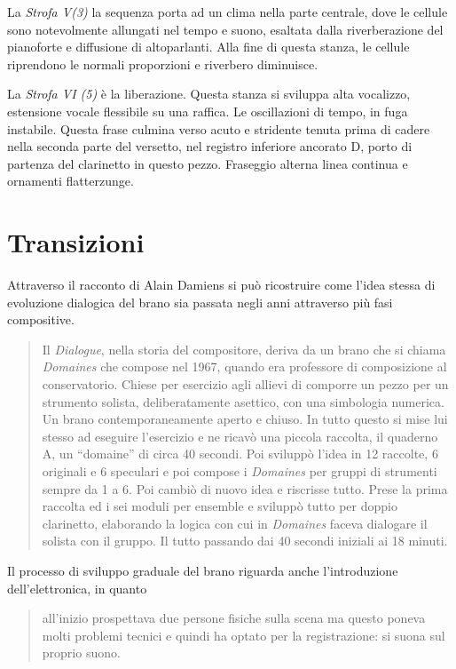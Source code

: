 La \emph{Strofa V(3)} la sequenza porta ad un clima nella parte centrale, dove le cellule sono notevolmente allungati nel tempo e suono, esaltata dalla riverberazione del pianoforte e diffusione di altoparlanti. Alla fine di questa stanza, le cellule riprendono le normali proporzioni e riverbero diminuisce.

La \emph{Strofa VI (5)} è la liberazione. Questa stanza si sviluppa alta vocalizzo, estensione vocale flessibile su una raffica. Le oscillazioni di tempo, in fuga instabile. Questa frase culmina verso acuto e stridente tenuta prima di cadere nella seconda parte del versetto, nel registro inferiore ancorato D, porto di partenza del clarinetto in questo pezzo. Fraseggio alterna linea continua e ornamenti flatterzunge.

\section*{Transizioni}

Attraverso il racconto di Alain Damiens si può ricostruire come l'idea stessa di evoluzione dialogica del brano sia passata negli anni attraverso più fasi compositive.

\begin{quote}
{\small
Il \emph{Dialogue}, nella storia del compositore, deriva da un brano che si chiama \emph{Domaines} che compose nel 1967, quando era professore di composizione al conservatorio. Chiese per esercizio agli allievi di comporre un pezzo per un strumento solista, deliberatamente asettico, con una simbologia numerica. Un brano contemporaneamente aperto e chiuso. In tutto questo si mise lui stesso ad eseguire l'esercizio e ne ricavò una piccola raccolta, il quaderno A, un “domaine” di circa 40 secondi. Poi sviluppò l'idea in 12 raccolte, 6 originali e 6 speculari e poi compose i \emph{Domaines} per gruppi di strumenti sempre da 1 a 6. Poi cambiò di nuovo idea e riscrisse tutto. Prese la prima raccolta ed i sei moduli per ensemble e sviluppò tutto per doppio clarinetto, elaborando la logica con cui in \emph{Domaines} faceva dialogare il solista con il gruppo. Il tutto passando dai 40 secondi iniziali ai 18 minuti.
}
\end{quote}

Il processo di sviluppo graduale del brano riguarda anche l'introduzione dell'elettronica, in quanto 
\begin{quote}
{\small
all'inizio prospettava due persone fisiche sulla scena ma questo poneva molti problemi tecnici e quindi ha optato per la registrazione: si suona sul proprio suono.
}
\end{quote}

